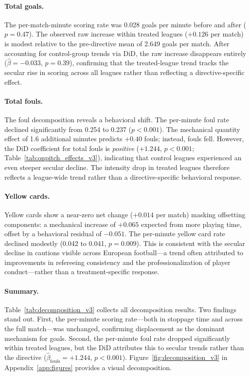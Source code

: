 \paragraph{Total goals.} The per-match-minute scoring rate was 0.028 goals per minute before and after ($p = 0.47$). The observed raw increase within treated leagues ($+0.126$ per match) is modest relative to the pre-directive mean of 2.649 goals per match.%
After accounting for control-group trends via DiD, the raw increase disappears entirely ($\hat{\beta} = -0.033$, $p = 0.39$), confirming that the treated-league trend tracks the secular rise in scoring across all leagues rather than reflecting a directive-specific effect.

\paragraph{Total fouls.} The foul decomposition reveals a behavioral shift. The per-minute foul rate declined significantly from 0.254 to 0.237 ($p < 0.001$). The mechanical quantity effect of 1.6 additional minutes predicts $+0.40$ fouls; instead, fouls fell. However, the DiD coefficient for total fouls is \emph{positive} ($+1.244$, $p < 0.001$; Table~\ref{tab:onpitch_effects_v3}), indicating that control leagues experienced an even steeper secular decline. The intensity drop in treated leagues therefore reflects a league-wide trend rather than a directive-specific behavioral response.

\paragraph{Yellow cards.} Yellow cards show a near-zero net change ($+0.014$
per match) masking offsetting components: a mechanical increase of $+0.065$
expected from more playing time, offset by a behavioral residual of $-0.051$.
The per-minute yellow card rate declined modestly (0.042 to 0.041, $p = 0.009$).
This is consistent with the secular decline in cautions visible across European
football---a trend often attributed to improvements in refereeing consistency
and the professionalization of player conduct---rather than a treatment-specific
response.

\paragraph{Summary.} Table~\ref{tab:decomposition_v3} collects all
decomposition results. Two findings stand out. First, the per-minute scoring
rate---both in stoppage time and across the full match---was unchanged,
confirming displacement as the dominant mechanism for goals. Second, the
per-minute foul rate dropped significantly within treated leagues, but the
DiD attributes this to secular trends rather than the directive
($\hat{\beta}_{\text{fouls}} = +1.244$, $p < 0.001$). Figure~\ref{fig:decomposition_v3}
in Appendix~\ref{app:figures} provides a visual decomposition.

